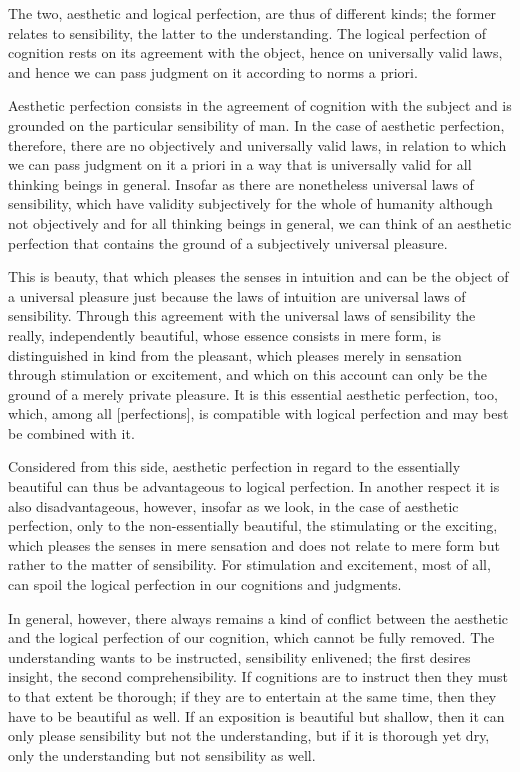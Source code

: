 The two, aesthetic and logical perfection,
are thus of different kinds;
the former relates to sensibility,
the latter to the understanding.
The logical perfection of cognition rests on
its agreement with the object,
hence on universally valid laws,
and hence we can pass judgment on it
according to norms a priori.

Aesthetic perfection consists in
the agreement of cognition with the subject
and is grounded on the particular sensibility of man.
In the case of aesthetic perfection, therefore,
there are no objectively and universally valid laws,
in relation to which we can pass judgment on it a priori
in a way that is universally valid for all thinking beings in general.
Insofar as there are nonetheless universal laws of sensibility,
which have validity subjectively for the whole of humanity
although not objectively and for all thinking beings in general,
we can think of an aesthetic perfection that contains
the ground of a subjectively universal pleasure.

This is beauty, that which pleases the senses in intuition
and can be the object of a universal pleasure
just because the laws of intuition are
universal laws of sensibility.
Through this agreement with
the universal laws of sensibility
the really, independently beautiful,
whose essence consists in mere form,
is distinguished in kind from the pleasant,
which pleases merely in sensation
through stimulation or excitement,
and which on this account can only be
the ground of a merely private pleasure.
It is this essential aesthetic perfection, too,
which, among all [perfections], is compatible with
logical perfection and may best be combined with it.

    Considered from this side,
    aesthetic perfection in regard to the essentially beautiful
    can thus be advantageous to logical perfection.
    In another respect it is also disadvantageous, however,
    insofar as we look, in the case of aesthetic perfection,
    only to the non-essentially beautiful,
    the stimulating or the exciting,
    which pleases the senses in mere sensation
    and does not relate to mere form
    but rather to the matter of sensibility.
    For stimulation and excitement, most of all,
    can spoil the logical perfection
    in our cognitions and judgments.

    In general, however, there always remains a kind of conflict
    between the aesthetic and the logical perfection of our cognition,
    which cannot be fully removed.
    The understanding wants to be instructed, sensibility enlivened;
    the first desires insight, the second comprehensibility.
    If cognitions are to instruct
    then they must to that extent be thorough;
    if they are to entertain at the same time,
    then they have to be beautiful as well.
    If an exposition is beautiful but shallow,
    then it can only please sensibility
    but not the understanding,
    but if it is thorough yet dry,
    only the understanding
    but not sensibility as well.

